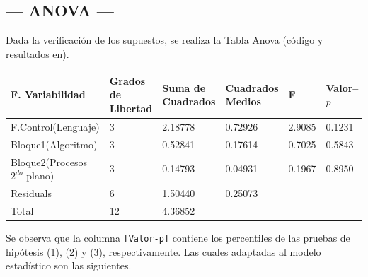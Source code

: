 \documentclass[11pt,a4paper]{article}
\begin{document}
\newpage

\subsection{--- ANOVA ---} %
\label{sub:anova}
Dada la verificación de los supuestos, se realiza la Tabla Anova (código y resultados en).
\begin{table}[hbt!]
	\footnotesize
	\centering
	\begin{tabular}{|*{6}{l|}}
		\hline
		F. Variabilidad                    & Grados de Libertad & Suma de Cuadrados & Cuadrados Medios & F & Valor--\(p\) \\ \hline
		F.Control(Lenguaje)                & 3 & 2.18778 & 0.72926  & 2.9085 & 0.1231 \\ \hline
		Bloque1(Algoritmo)                 & 3 & 0.52841 & 0.17614  & 0.7025 & 0.5843 \\ \hline
		Bloque2(Procesos \(2^{do}\) plano) & 3 & 0.14793 & 0.04931  & 0.1967 & 0.8950 \\ \hline
		Residuals                          & 6 & 1.50440 & 0.25073  &        &        \\ \hline
		Total                              &12 & 4.36852 &          &        & \\ \hline
	\end{tabular}
	\label{tab:anova}
\end{table}
Se observa que la columna \texttt{[Valor-p]} contiene los percentiles de las pruebas de hipótesis (1), (2) y (3), respectivamente. Las cuales adaptadas al modelo estadístico son las siguientes.
\end{document}
